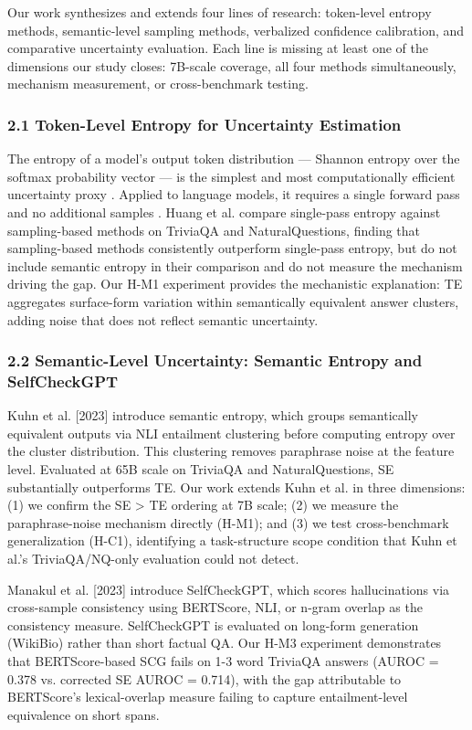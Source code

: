 
Our work synthesizes and extends four lines of research: token-level entropy methods, semantic-level sampling methods, verbalized confidence calibration, and comparative uncertainty evaluation. Each line is missing at least one of the dimensions our study closes: 7B-scale coverage, all four methods simultaneously, mechanism measurement, or cross-benchmark testing.

\subsubsection{2.1 Token-Level Entropy for Uncertainty Estimation}

The entropy of a model's output token distribution --- Shannon entropy over the softmax probability vector --- is the simplest and most computationally efficient uncertainty proxy \citep{Guo2017Calibration}. Applied to language models, it requires a single forward pass and no additional samples \citep{Huang2023Look}. Huang et al. compare single-pass entropy against sampling-based methods on TriviaQA and NaturalQuestions, finding that sampling-based methods consistently outperform single-pass entropy, but do not include semantic entropy in their comparison and do not measure the mechanism driving the gap. Our H-M1 experiment provides the mechanistic explanation: TE aggregates surface-form variation within semantically equivalent answer clusters, adding noise that does not reflect semantic uncertainty.

\subsubsection{2.2 Semantic-Level Uncertainty: Semantic Entropy and SelfCheckGPT}

Kuhn et al. [2023] introduce semantic entropy, which groups semantically equivalent outputs via NLI entailment clustering before computing entropy over the cluster distribution. This clustering removes paraphrase noise at the feature level. Evaluated at 65B scale on TriviaQA and NaturalQuestions, SE substantially outperforms TE. Our work extends Kuhn et al. in three dimensions: (1) we confirm the SE > TE ordering at 7B scale; (2) we measure the paraphrase-noise mechanism directly (H-M1); and (3) we test cross-benchmark generalization (H-C1), identifying a task-structure scope condition that Kuhn et al.'s TriviaQA/NQ-only evaluation could not detect.

Manakul et al. [2023] introduce SelfCheckGPT, which scores hallucinations via cross-sample consistency using BERTScore, NLI, or n-gram overlap as the consistency measure. SelfCheckGPT is evaluated on long-form generation (WikiBio) rather than short factual QA. Our H-M3 experiment demonstrates that BERTScore-based SCG fails on 1-3 word TriviaQA answers (AUROC = 0.378 vs. corrected SE AUROC = 0.714), with the gap attributable to BERTScore's lexical-overlap measure failing to capture entailment-level equivalence on short spans.

